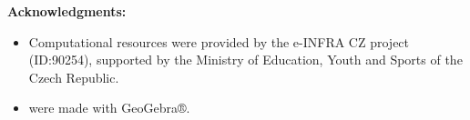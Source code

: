 

\def\bibfont{\hfuzz=2pt}

\printbibliography[heading=bibintoc]
\vspace{1em}
\noindent \textbf{Acknowledgments:}
\begin{itemize}[nosep]
	\item Computational resources were provided by the e-INFRA CZ project (ID:90254), supported by the Ministry of Education, Youth and Sports of the Czech Republic.
	\item {} were made with GeoGebra®.
\end{itemize}




